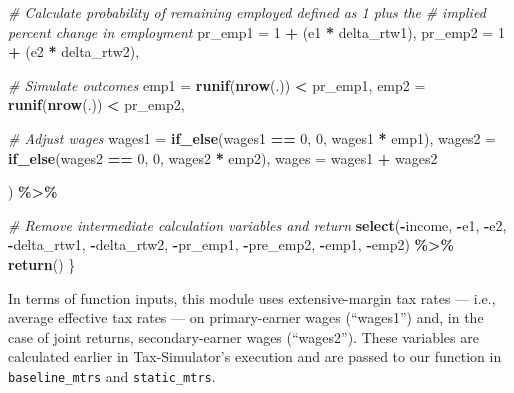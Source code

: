 \documentclass[
]{article}
\newenvironment{Shaded}{\begin{snugshade}}{\end{snugshade}}
\newcommand{\AttributeTok}[1]{\textcolor[rgb]{0.13,0.29,0.53}{#1}}
\newcommand{\CommentTok}[1]{\textcolor[rgb]{0.56,0.35,0.01}{\textit{#1}}}
\newcommand{\DecValTok}[1]{\textcolor[rgb]{0.00,0.00,0.81}{#1}}
\newcommand{\FunctionTok}[1]{\textcolor[rgb]{0.13,0.29,0.53}{\textbf{#1}}}
\newcommand{\NormalTok}[1]{#1}
\newcommand{\SpecialCharTok}[1]{\textcolor[rgb]{0.81,0.36,0.00}{\textbf{#1}}}
\begin{document}
\begin{Shaded}
\begin{Highlighting}[]
      \CommentTok{\# Calculate probability of remaining employed defined as 1 plus the }
      \CommentTok{\# implied percent change in employment }
      \AttributeTok{pr\_emp1 =} \DecValTok{1} \SpecialCharTok{+}\NormalTok{ (e1 }\SpecialCharTok{*}\NormalTok{ delta\_rtw1),}
      \AttributeTok{pr\_emp2 =} \DecValTok{1} \SpecialCharTok{+}\NormalTok{ (e2 }\SpecialCharTok{*}\NormalTok{ delta\_rtw2),}
      
      \CommentTok{\# Simulate outcomes}
      \AttributeTok{emp1 =} \FunctionTok{runif}\NormalTok{(}\FunctionTok{nrow}\NormalTok{(.)) }\SpecialCharTok{\textless{}}\NormalTok{ pr\_emp1,}
      \AttributeTok{emp2 =} \FunctionTok{runif}\NormalTok{(}\FunctionTok{nrow}\NormalTok{(.)) }\SpecialCharTok{\textless{}}\NormalTok{ pr\_emp2,}
      
      \CommentTok{\# Adjust wages}
      \AttributeTok{wages1 =} \FunctionTok{if\_else}\NormalTok{(wages1 }\SpecialCharTok{==} \DecValTok{0}\NormalTok{, }\DecValTok{0}\NormalTok{, wages1 }\SpecialCharTok{*}\NormalTok{ emp1),}
      \AttributeTok{wages2 =} \FunctionTok{if\_else}\NormalTok{(wages2 }\SpecialCharTok{==} \DecValTok{0}\NormalTok{, }\DecValTok{0}\NormalTok{, wages2 }\SpecialCharTok{*}\NormalTok{ emp2),}
      \AttributeTok{wages  =}\NormalTok{ wages1 }\SpecialCharTok{+}\NormalTok{ wages2 }
      
\NormalTok{    ) }\SpecialCharTok{\%\textgreater{}\%} 
    
    \CommentTok{\# Remove intermediate calculation variables and return }
    \FunctionTok{select}\NormalTok{(}\SpecialCharTok{{-}}\NormalTok{income, }\SpecialCharTok{{-}}\NormalTok{e1, }\SpecialCharTok{{-}}\NormalTok{e2, }\SpecialCharTok{{-}}\NormalTok{delta\_rtw1, }\SpecialCharTok{{-}}\NormalTok{delta\_rtw2, }
           \SpecialCharTok{{-}}\NormalTok{pr\_emp1, }\SpecialCharTok{{-}}\NormalTok{pre\_emp2, }\SpecialCharTok{{-}}\NormalTok{emp1, }\SpecialCharTok{{-}}\NormalTok{emp2) }\SpecialCharTok{\%\textgreater{}\%} 
    \FunctionTok{return}\NormalTok{()}
\NormalTok{\}}
\end{Highlighting}
\end{Shaded}

In terms of function inputs, this module uses extensive-margin tax rates
--- i.e., average effective tax rates --- on primary-earner wages
(``wages1'') and, in the case of joint returns, secondary-earner wages
(``wages2''). These variables are calculated earlier in Tax-Simulator's
execution and are passed to our function in \texttt{baseline\_mtrs} and
\texttt{static\_mtrs}.
\end{document}
